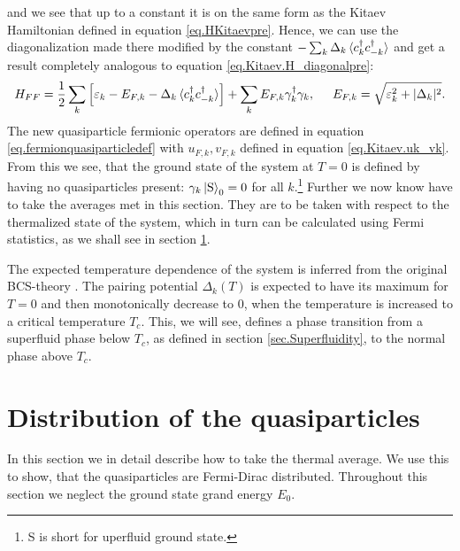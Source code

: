 and we see that up to a constant it is on the same form as the Kitaev Hamiltonian defined in equation \eqref{eq.HKitaevpre}. Hence, we can use the diagonalization made there modified by the constant $-\sum_k \Delta_k\braket {c^\dagger_k c^\dagger_{-k}} $ and get a result completely analogous to equation \eqref{eq.Kitaev.H_diagonalpre}: 
\begin{equation}
H_{FF} = \frac{1}{2}\sum_k \left[\varepsilon_k-E_{F,k}-\Delta_k\braket {c^\dagger_k c^\dagger_{-k}}\right] + \sum_k E_{F,k} \gamma^\dagger_k \gamma_k, \hspace{0.5cm} E_{F,k} = \sqrt{\varepsilon_k^2 + |\Delta_k|^2}.
\label{eq.Kitaev.HFF_diagonal}
\end{equation}
The new quasiparticle fermionic operators are defined in equation \eqref{eq.fermionquasiparticledef} with $u_{F,k},v_{F,k}$ defined in equation \eqref{eq.Kitaev.uk_vk}. From this we see, that the ground state of the system at $T=0$ is defined by having no quasiparticles present: $\gamma_k \ket{\text{S}}_0 = 0$ for all $k$.\footnote{S is short for uperfluid ground state.} Further we now know have to take the averages met in this section. They are to be taken with respect to the thermalized state of the system, which in turn can be calculated using Fermi statistics, as we shall see in section \ref{sec.Distributionquasiparticles}.

The expected temperature dependence of the system is inferred from the original BCS-theory \cite[chapter 3]{Tinkham}. The pairing potential $\Delta_k(T)$ is expected to have its maximum for $T = 0$ and then monotonically decrease to 0, when the temperature is increased to a critical temperature $T_c$. This, we will see, defines a phase transition from a superfluid phase below $T_c$, as defined in section \ref{sec.Superfluidity}, to the normal phase above $T_c$.

\section{Distribution of the quasiparticles} \label{sec.Distributionquasiparticles}
In this section we in detail describe how to take the thermal average. We use this to show, that the quasiparticles are Fermi-Dirac distributed. Throughout this section we neglect the ground state grand energy $E_0$.

